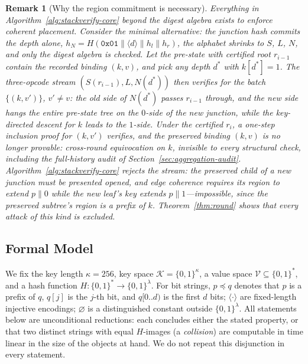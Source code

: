 \documentclass[twocolumn]{article}
\newtheorem{remark}{Remark}
\begin{document}
\begin{remark}[Why the region commitment is necessary]
\label{rem:placement}
Everything in Algorithm~\ref{alg:stackverify-core} beyond the digest algebra exists to enforce coherent placement. Consider the minimal alternative: the junction hash commits the depth alone, $h_N = H(\texttt{0x01} \| \langle d\rangle \| h_l \| h_r)$, the alphabet shrinks to $S$, $L$, $N$, and only the digest algebra is checked. Let the pre-state with certified root $r_{i-1}$ contain the recorded binding $(k, v)$, and pick any depth $d^{*}$ with $k[d^{*}] = 1$. The three-opcode stream $(S(r_{i-1}), L, N(d^{*}))$ then verifies for the batch $\{(k, v')\}$, $v' \ne v$: the old side of $N(d^{*})$ passes $r_{i-1}$ through, and the new side hangs the entire pre-state tree on the $0$-side of the new junction, while the key-directed descent for $k$ leads to the $1$-side. Under the certified $r_i$, a one-step inclusion proof for $(k, v')$ verifies, and the preserved binding $(k, v)$ is no longer provable: cross-round equivocation on $k$, invisible to every structural check, including the full-history audit of Section~\ref{sec:aggregation-audit}. Algorithm~\ref{alg:stackverify-core} rejects the stream: the preserved child of a new junction must be presented opened, and edge coherence requires its region to extend $p\|0$ while the new leaf's key extends $p\|1$---impossible, since the preserved subtree's region is a prefix of $k$. Theorem~\ref{thm:round} shows that every attack of this kind is excluded.
\end{remark}

\subsection{Formal Model}
\label{sec:consistency-formal}

We fix the key length $\kappa = 256$, key space $\mathcal{K} = \{0,1\}^{\kappa}$, a value space $\mathcal{V} \subseteq \{0,1\}^{*}$, and a hash function $H \colon \{0,1\}^{*} \to \{0,1\}^{\lambda}$. For bit strings, $p \preceq q$ denotes that $p$ is a prefix of $q$, $q[j]$ is the $j$-th bit, and $q[0..d)$ is the first $d$ bits; $\langle\cdot\rangle$ are fixed-length injective encodings; $\varnothing$ is a distinguished constant outside $\{0,1\}^{\lambda}$. All statements below are unconditional reductions: each concludes either the stated property, or that two distinct strings with equal $H$-images (a \emph{collision}) are computable in time linear in the size of the objects at hand. We do not repeat this disjunction in every statement.
\end{document}
